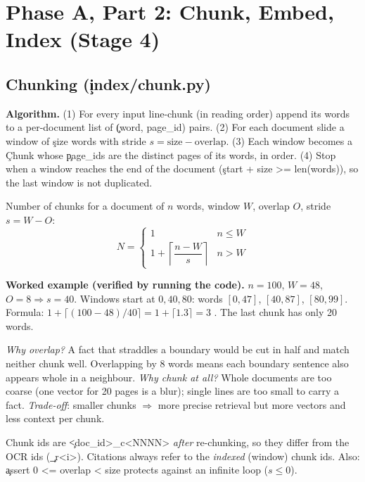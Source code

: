 \chapter{Phase A, Part 2: Chunk, Embed, Index (Stage 4)}
\section{Chunking (\c{index/chunk.py})}
\textbf{Algorithm.} (1) For every input line-chunk (in reading order) append its words to a per-document list of \c{(word, page\_id)} pairs. (2) For each document slide a window of \c{size} words with stride $s=\text{size}-\text{overlap}$. (3) Each window becomes a \c{Chunk} whose \c{page\_ids} are the distinct pages of its words, in order. (4) Stop when a window reaches the end of the document (\c{start + size >= len(words)}), so the last window is not duplicated.

\begin{keyidea}
Number of chunks for a document of $n$ words, window $W$, overlap $O$, stride $s=W-O$:
\[ N = \begin{cases}1 & n\le W\\ 1+\left\lceil \dfrac{n-W}{s}\right\rceil & n>W\end{cases}\]
\end{keyidea}
\textbf{Worked example (verified by running the code).} $n=100$, $W=48$, $O=8\Rightarrow s=40$. Windows start at $0,40,80$: words $[0,47]$, $[40,87]$, $[80,99]$. Formula: $1+\lceil (100-48)/40\rceil=1+\lceil1.3\rceil=3$ \checkmark. The last chunk has only 20 words.

\begin{why}
\emph{Why overlap?} A fact that straddles a boundary would be cut in half and match neither chunk well. Overlapping by 8 words means each boundary sentence also appears whole in a neighbour. \emph{Why chunk at all?} Whole documents are too coarse (one vector for 20 pages is a blur); single lines are too small to carry a fact. \emph{Trade-off}: smaller chunks $\Rightarrow$ more precise retrieval but more vectors and less context per chunk.
\end{why}
\begin{gotcha}
Chunk ids are \c{<doc\_id>\_c<NNNN>} \emph{after} re-chunking, so they differ from the OCR ids (\c{\_r<i>}). Citations always refer to the \emph{indexed} (window) chunk ids. Also: \c{assert 0 <= overlap < size} protects against an infinite loop ($s\le0$).
\end{gotcha}

